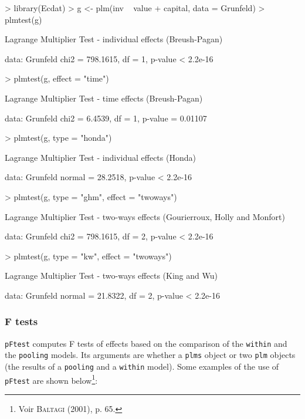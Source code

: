 \documentclass{article}
\begin{document}
\begin{Schunk}
\begin{Sinput}
> library(Ecdat)
> g <- plm(inv ~ value + capital, data = Grunfeld)
> plmtest(g)
\end{Sinput}
\begin{Soutput}
	Lagrange Multiplier Test - individual effects (Breush-Pagan)

data:  Grunfeld 
chi2 = 798.1615, df = 1, p-value < 2.2e-16
\end{Soutput}
\begin{Sinput}
> plmtest(g, effect = "time")
\end{Sinput}
\begin{Soutput}
	Lagrange Multiplier Test - time effects (Breush-Pagan)

data:  Grunfeld 
chi2 = 6.4539, df = 1, p-value = 0.01107
\end{Soutput}
\begin{Sinput}
> plmtest(g, type = "honda")
\end{Sinput}
\begin{Soutput}
	Lagrange Multiplier Test - individual effects (Honda)

data:  Grunfeld 
normal = 28.2518, p-value < 2.2e-16
\end{Soutput}
\begin{Sinput}
> plmtest(g, type = "ghm", effect = "twoways")
\end{Sinput}
\begin{Soutput}
	Lagrange Multiplier Test - two-ways effects (Gourierroux, Holly and
	Monfort)

data:  Grunfeld 
chi2 = 798.1615, df = 2, p-value < 2.2e-16
\end{Soutput}
\begin{Sinput}
> plmtest(g, type = "kw", effect = "twoways")
\end{Sinput}
\begin{Soutput}
	Lagrange Multiplier Test - two-ways effects (King and Wu)

data:  Grunfeld 
normal = 21.8322, df = 2, p-value < 2.2e-16
\end{Soutput}
\end{Schunk}

\subsubsection{F tests}

\texttt{pFtest} computes F tests of effects based on the comparison of
the  \texttt{within} and the \texttt{pooling} models. Its arguments
are whether a \texttt{plms} object or two \texttt{plm} objects
(the results of a  \texttt{pooling} and a \texttt{within} model).
Some examples of the use of \texttt{pFtest} are shown below\footnote{Voir \textsc{Baltagi} (2001),
  p. 65.}:
\end{document}
